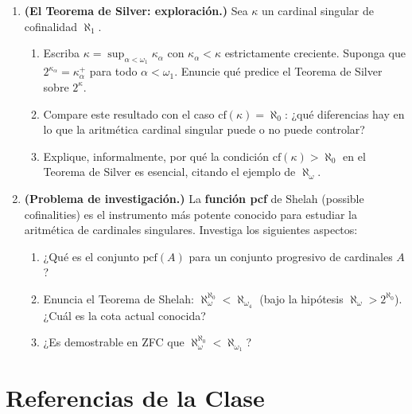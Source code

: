 \begin{enumerate}[leftmargin=2em, label=\textbf{\arabic*.}]
\item \textbf{(El Teorema de Silver: exploración.)}
Sea $\kappa$ un cardinal singular de cofinalidad $\aleph_1$.
\begin{enumerate}[label=(\alph*)]
  \item Escriba $\kappa = \sup_{\alpha < \omega_1} \kappa_\alpha$ con $\kappa_\alpha < \kappa$ estrictamente creciente. Suponga que $2^{\kappa_\alpha} = \kappa_\alpha^+$ para todo $\alpha < \omega_1$. Enuncie qué predice el Teorema de Silver sobre $2^\kappa$.
  \item Compare este resultado con el caso $\mathrm{cf}(\kappa) = \aleph_0$: ¿qué diferencias hay en lo que la aritmética cardinal singular puede o no puede controlar?
  \item Explique, informalmente, por qué la condición $\mathrm{cf}(\kappa) > \aleph_0$ en el Teorema de Silver es esencial, citando el ejemplo de $\aleph_\omega$.
\end{enumerate}

\item \textbf{(Problema de investigación.)}
La \textbf{función pcf} de Shelah (possible cofinalities) es el instrumento más potente conocido para estudiar la aritmética de cardinales singulares. Investiga los siguientes aspectos:
\begin{enumerate}[label=(\alph*)]
  \item ¿Qué es el conjunto $\mathrm{pcf}(A)$ para un conjunto progresivo de cardinales $A$?
  \item Enuncia el Teorema de Shelah: $\aleph_\omega^{\aleph_0} < \aleph_{\omega_4}$ (bajo la hipótesis $\aleph_\omega > 2^{\aleph_0}$). ¿Cuál es la cota actual conocida?
  \item ¿Es demostrable en ZFC que $\aleph_\omega^{\aleph_0} < \aleph_{\omega_1}$?
\end{enumerate}

\end{enumerate}

\section{Referencias de la Clase}

